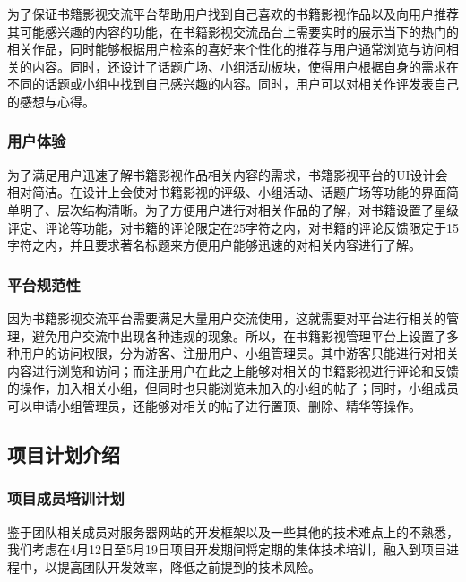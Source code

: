 \documentclass[
]{article}
\begin{document}
为了保证书籍影视交流平台帮助用户找到自己喜欢的书籍影视作品以及向用户推荐其可能感兴趣的内容的功能，在书籍影视交流品台上需要实时的展示当下的热门的相关作品，同时能够根据用户检索的喜好来个性化的推荐与用户通常浏览与访问相关的内容。同时，还设计了话题广场、小组活动板块，使得用户根据自身的需求在不同的话题或小组中找到自己感兴趣的内容。同时，用户可以对相关作评发表自己的感想与心得。

\hypertarget{header-n622}{%
\subsubsection{用户体验}\label{header-n622}}

为了满足用户迅速了解书籍影视作品相关内容的需求，书籍影视平台的UI设计会相对简洁。在设计上会使对书籍影视的评级、小组活动、话题广场等功能的界面简单明了、层次结构清晰。为了方便用户进行对相关作品的了解，对书籍设置了星级评定、评论等功能，对书籍的评论限定在25字符之内，对书籍的评论反馈限定于15字符之内，并且要求著名标题来方便用户能够迅速的对相关内容进行了解。

\hypertarget{header-n624}{%
\subsubsection{平台规范性}\label{header-n624}}

因为书籍影视交流平台需要满足大量用户交流使用，这就需要对平台进行相关的管理，避免用户交流中出现各种违规的现象。所以，在书籍影视管理平台上设置了多种用户的访问权限，分为游客、注册用户、小组管理员。其中游客只能进行对相关内容进行浏览和访问；而注册用户在此之上能够对相关的书籍影视进行评论和反馈的操作，加入相关小组，但同时也只能浏览未加入的小组的帖子；同时，小组成员可以申请小组管理员，还能够对相关的帖子进行置顶、删除、精华等操作。

\hypertarget{header-n626}{%
\subsection{项目计划介绍}\label{header-n626}}

\hypertarget{header-n627}{%
\subsubsection{项目成员培训计划}\label{header-n627}}

鉴于团队相关成员对服务器网站的开发框架以及一些其他的技术难点上的不熟悉，我们考虑在4月12日至5月19日项目开发期间将定期的集体技术培训，融入到项目进程中，以提高团队开发效率，降低之前提到的技术风险。
\end{document}

